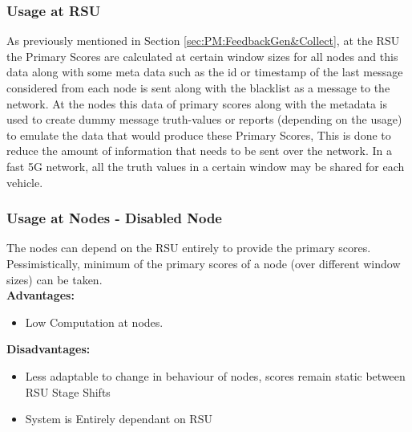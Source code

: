 \documentclass[journal]{IEEEtran}
\begin{document}
\subsubsection{Usage at RSU}
As previously mentioned in Section \ref{sec:PM:FeedbackGen&Collect}, at the RSU the Primary Scores are calculated at certain window sizes for all nodes and this data along with some meta data such as the id or timestamp of the last message considered from each node is sent along with the blacklist as a message to the network. At the nodes this data of primary scores along with the metadata is used to create dummy message truth-values or reports (depending on the usage) to emulate the data that would produce these Primary Scores, This is done to reduce the amount of information that needs to be sent over the network. In a fast 5G network, all the truth values in a certain window may be shared for each vehicle.
\subsubsection{Usage at Nodes - Disabled Node}
The nodes can depend on the RSU entirely to provide the primary scores. Pessimistically, minimum of the primary scores of a node (over different window sizes) can be taken.\\
\textbf{Advantages:} 
\begin{itemize}
	\item Low Computation at nodes.
\end{itemize}
\textbf{Disadvantages:} 
\begin{itemize}
	\item Less adaptable to change in behaviour of nodes, scores remain static between RSU Stage Shifts
	\item System is Entirely dependant on RSU
\end{itemize}
\end{document}

